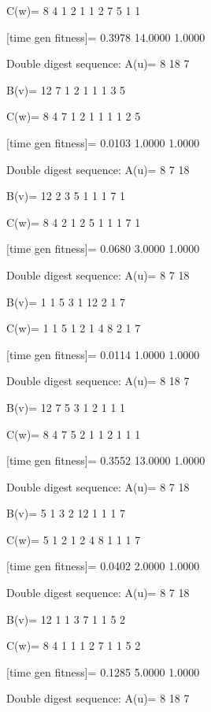 C(w)=
     8     4     1     2     1     1     2     7     5     1     1

[time gen fitness]=
    0.3978   14.0000    1.0000

Double digest sequence:
A(u)=
     8    18     7

B(v)=
    12     7     1     2     1     1     1     3     5

C(w)=
     8     4     7     1     2     1     1     1     1     2     5

[time gen fitness]=
    0.0103    1.0000    1.0000

Double digest sequence:
A(u)=
     8     7    18

B(v)=
    12     2     3     5     1     1     1     7     1

C(w)=
     8     4     2     1     2     5     1     1     1     7     1

[time gen fitness]=
    0.0680    3.0000    1.0000

Double digest sequence:
A(u)=
     8     7    18

B(v)=
     1     1     5     3     1    12     2     1     7

C(w)=
     1     1     5     1     2     1     4     8     2     1     7

[time gen fitness]=
    0.0114    1.0000    1.0000

Double digest sequence:
A(u)=
     8    18     7

B(v)=
    12     7     5     3     1     2     1     1     1

C(w)=
     8     4     7     5     2     1     1     2     1     1     1

[time gen fitness]=
    0.3552   13.0000    1.0000

Double digest sequence:
A(u)=
     8     7    18

B(v)=
     5     1     3     2    12     1     1     1     7

C(w)=
     5     1     2     1     2     4     8     1     1     1     7

[time gen fitness]=
    0.0402    2.0000    1.0000

Double digest sequence:
A(u)=
     8     7    18

B(v)=
    12     1     1     3     7     1     1     5     2

C(w)=
     8     4     1     1     1     2     7     1     1     5     2

[time gen fitness]=
    0.1285    5.0000    1.0000

Double digest sequence:
A(u)=
     8    18     7

